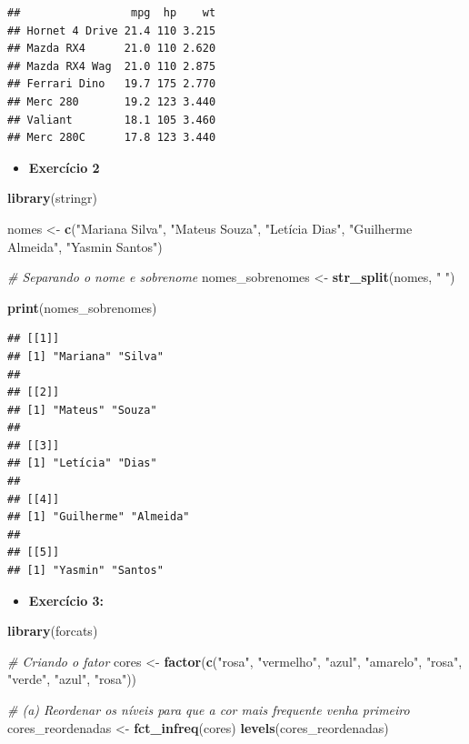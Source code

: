 \documentclass[
]{book}
\newenvironment{Shaded}{\begin{snugshade}}{\end{snugshade}}
\newcommand{\CommentTok}[1]{\textcolor[rgb]{0.56,0.35,0.01}{\textit{#1}}}
\newcommand{\FunctionTok}[1]{\textcolor[rgb]{0.13,0.29,0.53}{\textbf{#1}}}
\newcommand{\NormalTok}[1]{#1}
\newcommand{\OtherTok}[1]{\textcolor[rgb]{0.56,0.35,0.01}{#1}}
\newcommand{\StringTok}[1]{\textcolor[rgb]{0.31,0.60,0.02}{#1}}
\providecommand{\tightlist}{%
  \setlength{\itemsep}{0pt}\setlength{\parskip}{0pt}}
\begin{document}
\begin{verbatim}
##                 mpg  hp    wt
## Hornet 4 Drive 21.4 110 3.215
## Mazda RX4      21.0 110 2.620
## Mazda RX4 Wag  21.0 110 2.875
## Ferrari Dino   19.7 175 2.770
## Merc 280       19.2 123 3.440
## Valiant        18.1 105 3.460
## Merc 280C      17.8 123 3.440
\end{verbatim}

\begin{itemize}
\tightlist
\item
  \textbf{Exercício 2}
\end{itemize}

\begin{Shaded}
\begin{Highlighting}[]
\FunctionTok{library}\NormalTok{(stringr)}

\NormalTok{nomes }\OtherTok{\textless{}{-}} \FunctionTok{c}\NormalTok{(}\StringTok{"Mariana Silva"}\NormalTok{, }\StringTok{"Mateus Souza"}\NormalTok{, }\StringTok{"Letícia Dias"}\NormalTok{, }\StringTok{"Guilherme Almeida"}\NormalTok{, }
           \StringTok{"Yasmin Santos"}\NormalTok{)}

\CommentTok{\# Separando o nome e sobrenome}
\NormalTok{nomes\_sobrenomes }\OtherTok{\textless{}{-}} \FunctionTok{str\_split}\NormalTok{(nomes, }\StringTok{" "}\NormalTok{)}

\FunctionTok{print}\NormalTok{(nomes\_sobrenomes)}
\end{Highlighting}
\end{Shaded}

\begin{verbatim}
## [[1]]
## [1] "Mariana" "Silva"  
## 
## [[2]]
## [1] "Mateus" "Souza" 
## 
## [[3]]
## [1] "Letícia" "Dias"   
## 
## [[4]]
## [1] "Guilherme" "Almeida"  
## 
## [[5]]
## [1] "Yasmin" "Santos"
\end{verbatim}

\begin{itemize}
\tightlist
\item
  \textbf{Exercício 3:}
\end{itemize}

\begin{Shaded}
\begin{Highlighting}[]
\FunctionTok{library}\NormalTok{(forcats)}

\CommentTok{\# Criando o fator}
\NormalTok{cores }\OtherTok{\textless{}{-}} \FunctionTok{factor}\NormalTok{(}\FunctionTok{c}\NormalTok{(}\StringTok{"rosa"}\NormalTok{, }\StringTok{"vermelho"}\NormalTok{, }\StringTok{"azul"}\NormalTok{, }\StringTok{"amarelo"}\NormalTok{, }\StringTok{"rosa"}\NormalTok{, }\StringTok{"verde"}\NormalTok{, }\StringTok{"azul"}\NormalTok{, }\StringTok{"rosa"}\NormalTok{))}

\CommentTok{\# (a) Reordenar os níveis para que a cor mais frequente venha primeiro}
\NormalTok{cores\_reordenadas }\OtherTok{\textless{}{-}} \FunctionTok{fct\_infreq}\NormalTok{(cores)}
\FunctionTok{levels}\NormalTok{(cores\_reordenadas)}
\end{Highlighting}
\end{Shaded}
\end{document}
